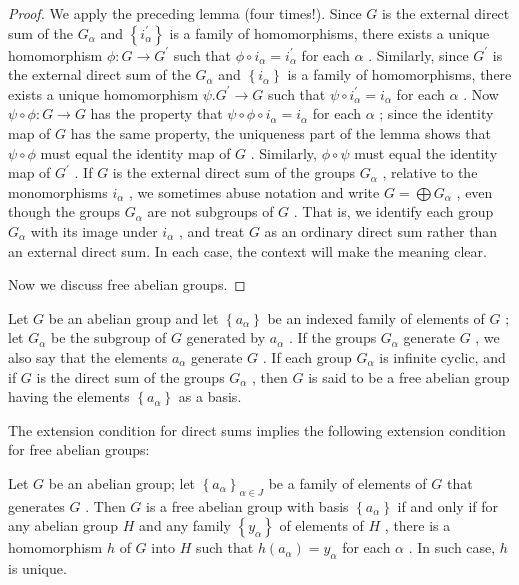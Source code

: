\begin{proof}We apply the preceding lemma (four times!). Since \(G\) is the external direct sum of the \({G}_{\alpha }\) and \(\left\{  {i}_{\alpha }^{\prime }\right\}\) is a family of homomorphisms, there exists a unique homomorphism \(\phi  : G \rightarrow  {G}^{\prime }\) such that \(\phi  \circ  {i}_{\alpha } = {i}_{\alpha }^{\prime }\) for each \(\alpha\) . Similarly, since \({G}^{\prime }\) is the external direct sum of the \({G}_{\alpha }\) and \(\left\{  {i}_{\alpha }\right\}\) is a family of homomorphisms, there exists a unique homomorphism \(\psi .{G}^{\prime } \rightarrow  G\) such that \(\psi  \circ  {i}_{\alpha }^{\prime } = {i}_{\alpha }\) for each \(\alpha\) . Now \(\psi  \circ  \phi  : G \rightarrow  G\) has the property that \(\psi  \circ  \phi  \circ  {i}_{\alpha } = {i}_{\alpha }\) for each \(\alpha\) ; since the identity map of \(G\) has the same property, the uniqueness part of the lemma shows that \(\psi  \circ  \phi\) must equal the identity map of \(G\) . Similarly, \(\phi  \circ  \psi\) must equal the identity map of \({G}^{\prime }\) .
If \(G\) is the external direct sum of the groups \({G}_{\alpha }\) , relative to the monomorphisms \({i}_{\alpha }\) , we sometimes abuse notation and write \(G = \bigoplus {G}_{\alpha }\) , even though the groups \({G}_{\alpha }\) are not subgroups of \(G\) . That is, we identify each group \({G}_{\alpha }\) with its image under \({i}_{\alpha }\) , and treat \(G\) as an ordinary direct sum rather than an external direct sum. In each case, the context will make the meaning clear.

Now we discuss free abelian groups.
\end{proof}
\begin{definition} Let \(G\) be an abelian group and let \(\left\{  {a}_{\alpha }\right\}\) be an indexed family of elements of \(G\) ; let \({G}_{\alpha }\) be the subgroup of \(G\) generated by \({a}_{\alpha }\) . If the groups \({G}_{\alpha }\) generate \(G\) , we also say that the elements \({a}_{\alpha }\) generate \(G\) . If each group \({G}_{\alpha }\) is infinite cyclic, and if \(G\) is the direct sum of the groups \({G}_{\alpha }\) , then \(G\) is said to be a free abelian group having the elements \(\left\{  {a}_{\alpha }\right\}\) as a basis.
\end{definition}

The extension condition for direct sums implies the following extension condition for free abelian groups:

\begin{lemma} Let \(G\) be an abelian group; let \({\left\{  {a}_{\alpha }\right\}  }_{\alpha  \in  J}\) be a family of elements of \(G\) that generates \(G\) . Then \(G\) is a free abelian group with basis \(\left\{  {a}_{\alpha }\right\}\) if and only if for any abelian group \(H\) and any family \(\left\{  {y}_{\alpha }\right\}\) of elements of \(H\) , there is a homomorphism \(h\) of \(G\) into \(H\) such that \(h\left( {a}_{\alpha }\right)  = {y}_{\alpha }\) for each \(\alpha\) . In such case, \(h\) is unique.
\end{lemma}

